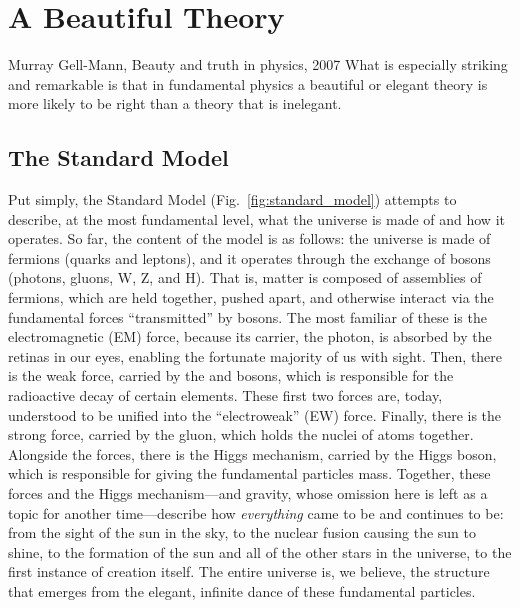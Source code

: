 \chapter{A Beautiful Theory}
\begin{aquote}{Murray Gell-Mann, Beauty and truth in physics, 2007}
    What is especially striking and remarkable is that in fundamental physics 
    a beautiful or elegant theory is more likely to be right 
    than a theory that is inelegant.
\end{aquote}

\section{The Standard Model}
Put simply, the Standard Model (Fig.~\ref{fig:standard_model}) attempts to describe, at the most fundamental level, what the universe is made of and how it operates. 
So far, the content of the model is as follows: the universe is made of fermions (quarks and leptons), and it operates through the exchange of bosons (photons, gluons, W, Z, and H). 
That is, matter\footnotemark{} is composed of assemblies of fermions, which are held together, pushed apart, and otherwise interact via the fundamental forces ``transmitted'' by bosons. 
The most familiar of these is the electromagnetic (EM) force, because its carrier, the photon, is absorbed by the retinas in our eyes, enabling the fortunate majority of us with sight. 
Then, there is the weak force, carried by the \PW and \PZ bosons, which is responsible for the radioactive decay of certain elements. 
These first two forces are, today, understood to be unified into the ``electroweak'' (EW) force. 
Finally, there is the strong force, carried by the gluon, which holds the nuclei of atoms together. 
Alongside the forces, there is the Higgs mechanism, carried by the Higgs boson, which is responsible for giving the fundamental particles mass. 
Together, these forces and the Higgs mechanism---and gravity, whose omission here is left as a topic for another time---describe how \textit{everything} came to be and continues to be: from the sight of the sun in the sky, to the nuclear fusion causing the sun to shine, to the formation of the sun and all of the other stars in the universe, to the first instance of creation itself. 
The entire universe is, we believe, the structure that emerges from the elegant, infinite dance of these fundamental particles. 

